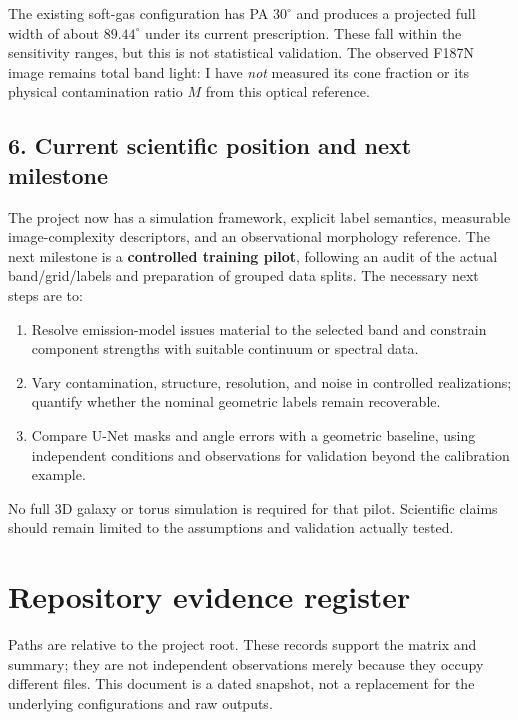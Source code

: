 \documentclass[10pt,letterpaper]{article}
\begin{document}
The existing soft-gas configuration has PA $30^\circ$ and produces a projected full width of about
$89.44^\circ$ under its current prescription. These fall within the sensitivity ranges, but this is
not statistical validation. The observed F187N image remains total band light: I have \emph{not}
measured its cone fraction or its physical contamination ratio $M$ from this optical reference.

\subsection*{6. Current scientific position and next milestone}
The project now has a simulation framework, explicit label semantics, measurable image-complexity
descriptors, and an observational morphology reference. The next milestone is a \textbf{controlled
training pilot}, following an audit of the actual band/grid/labels and preparation of grouped data
splits. The necessary next steps are to:
\begin{enumerate}
\item Resolve emission-model issues material to the selected band and constrain component strengths
with suitable continuum or spectral data.
\item Vary contamination, structure, resolution, and noise in controlled realizations; quantify
whether the nominal geometric labels remain recoverable.
\item Compare U-Net masks and angle errors with a geometric baseline, using independent conditions
and observations for validation beyond the calibration example.
\end{enumerate}
No full 3D galaxy or torus simulation is required for that pilot. Scientific claims should remain
limited to the assumptions and validation actually tested.

\clearpage
\section*{Repository evidence register}
Paths are relative to the project root. These records support the matrix and summary; they are not
independent observations merely because they occupy different files. This document is a dated
snapshot, not a replacement for the underlying configurations and raw outputs.
\end{document}
